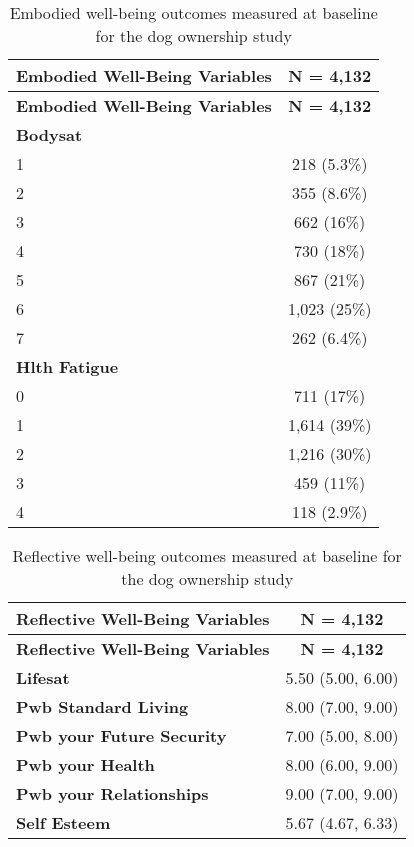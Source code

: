 \documentclass[
  singlecolumn,
  9pt]{article}
\begin{document}
\begin{longtable}[]{@{}lc@{}}
\caption{Embodied well-being outcomes measured at baseline for the dog
ownership study}\label{tbl-table_embody_vars_dogs-m}\tabularnewline
\toprule\noalign{}
\textbf{Embodied Well-Being Variables} & \textbf{N = 4,132} \\
\midrule\noalign{}
\endfirsthead
\toprule\noalign{}
\textbf{Embodied Well-Being Variables} & \textbf{N = 4,132} \\
\midrule\noalign{}
\endhead
\bottomrule\noalign{}
\endlastfoot
\textbf{Bodysat} & \\
1 & 218 (5.3\%) \\
2 & 355 (8.6\%) \\
3 & 662 (16\%) \\
4 & 730 (18\%) \\
5 & 867 (21\%) \\
6 & 1,023 (25\%) \\
7 & 262 (6.4\%) \\
\textbf{Hlth Fatigue} & \\
0 & 711 (17\%) \\
1 & 1,614 (39\%) \\
2 & 1,216 (30\%) \\
3 & 459 (11\%) \\
4 & 118 (2.9\%) \\
\end{longtable}

\begin{longtable}[]{@{}lc@{}}
\caption{Reflective well-being outcomes measured at baseline for the dog
ownership study}\label{tbl-table_reflective_vars_dogs-m}\tabularnewline
\toprule\noalign{}
\textbf{Reflective Well-Being Variables} & \textbf{N = 4,132} \\
\midrule\noalign{}
\endfirsthead
\toprule\noalign{}
\textbf{Reflective Well-Being Variables} & \textbf{N = 4,132} \\
\midrule\noalign{}
\endhead
\bottomrule\noalign{}
\endlastfoot
\textbf{Lifesat} & 5.50 (5.00, 6.00) \\
\textbf{Pwb Standard Living} & 8.00 (7.00, 9.00) \\
\textbf{Pwb your Future Security} & 7.00 (5.00, 8.00) \\
\textbf{Pwb your Health} & 8.00 (6.00, 9.00) \\
\textbf{Pwb your Relationships} & 9.00 (7.00, 9.00) \\
\textbf{Self Esteem} & 5.67 (4.67, 6.33) \\
\end{longtable}
\end{document}
